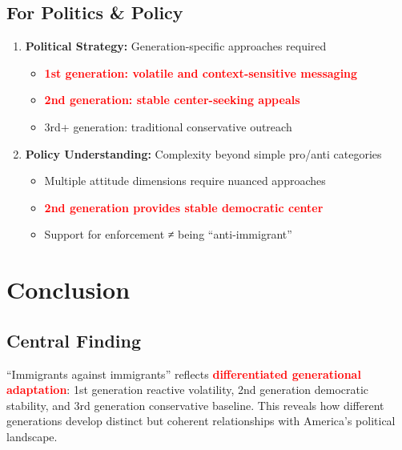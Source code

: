 \subsection{For Politics \& Policy}
\begin{enumerate}
    \item \textbf{Political Strategy:} Generation-specific approaches required
        \begin{itemize}
            \item \textcolor{red}{\textbf{1st generation: volatile and context-sensitive messaging}}
            \item \textcolor{red}{\textbf{2nd generation: stable center-seeking appeals}}
            \item 3rd+ generation: traditional conservative outreach
        \end{itemize}
    
    \item \textbf{Policy Understanding:} Complexity beyond simple pro/anti categories
        \begin{itemize}
            \item Multiple attitude dimensions require nuanced approaches
            \item \textcolor{red}{\textbf{2nd generation provides stable democratic center}}
            \item Support for enforcement ≠ being ``anti-immigrant''
        \end{itemize}
\end{enumerate}


\section{Conclusion}

\subsection{Central Finding}
``Immigrants against immigrants'' reflects \textbf{\textcolor{red}{differentiated generational adaptation}}: 1st generation reactive volatility, 2nd generation democratic stability, and 3rd generation conservative baseline. This reveals how different generations develop distinct but coherent relationships with America's political landscape.

